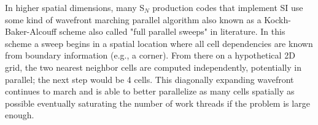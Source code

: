 In higher spatial dimensions, many S$_N$ production codes that implement SI use some kind of wavefront marching parallel algorithm also known as a Kockh-Baker-Alcouff scheme \cite{baker_kba_2017, colomer_parallel_2013} also called "full parallel sweeps" in literature.
In this scheme a sweep begins in a spatial location where all cell dependencies are known from boundary information (e.g., a corner).
From there on a hypothetical 2D grid, the two nearest neighbor cells are computed independently, potentially in parallel; the next step would be 4 cells.
This diagonally expanding wavefront continues to march and is able to better parallelize as many cells spatially as possible eventually saturating the number of work threads if the problem is large enough.




